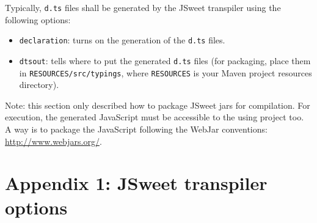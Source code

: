 \documentclass[a4paper]{report}
\begin{document}
Typically, \texttt{d.ts} files shall be generated by the JSweet transpiler using the following options:

\begin{itemize}
\item \texttt{declaration}: turns on the generation of the \texttt{d.ts} files. 
\item \texttt{dtsout}: tells where to put the generated \texttt{d.ts} files (for packaging, place them in \texttt{RESOURCES/src/typings}, where \texttt{RESOURCES} is your Maven project resources directory). 
\end{itemize}

Note: this section only described how to package JSweet jars for compilation. For execution, the generated JavaScript must be accessible to the using project too. A way is to package the JavaScript following the WebJar conventions: \url{http://www.webjars.org/}.

\chapter*{Appendix 1: JSweet transpiler options}
\end{document}
